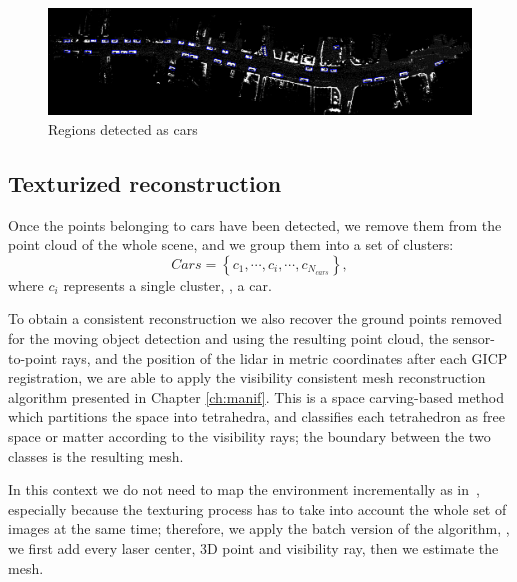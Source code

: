 \begin{figure}[tp]
 \centering
 \includegraphics[width=0.98\columnwidth]{./img/ch-laser/drawing.png}
 \caption{Regions detected as cars}
 \label{fig:drawing}
\end{figure}



\subsection{Texturized reconstruction}
Once the points belonging to cars have been detected, we remove them from the point cloud of the whole scene, and we group them into a set of clusters:
\begin{equation}
Cars = \left\{c_1, \cdots, c_i, \cdots, c_{N_{cars}}  \right\},
\end{equation}
where $c_i$ represents a single cluster, \ie, a car.

To obtain a consistent reconstruction we also recover the ground points removed for the moving object detection and using the resulting point cloud, the sensor-to-point rays, and the position of the lidar in metric coordinates after each GICP registration, we are able to apply the visibility consistent mesh reconstruction algorithm presented in Chapter \ref{ch:manif}.
This is a space carving-based method which partitions the space into tetrahedra, and classifies each tetrahedron as free space or matter according to the visibility rays; the boundary between the two classes is the resulting mesh. 

In this context we do not need to map the environment incrementally as in~\cite{romanoni15b}, especially because the texturing process has to take into account the whole set of images at the same time; therefore, we apply the batch version of the algorithm, \ie, we first add every laser center, 3D point and visibility ray, then we estimate the mesh. 

